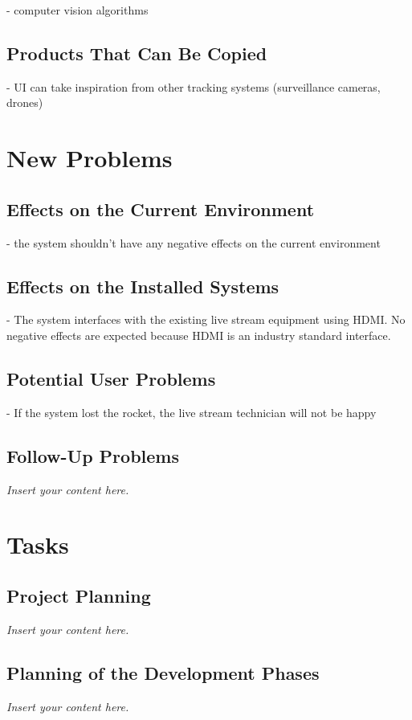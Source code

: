 \documentclass[12pt]{article}
\newcommand{\lips}{\textit{Insert your content here.}}
\begin{document}
- computer vision algorithms

\subsection{Products That Can Be Copied}

- UI can take inspiration from other tracking systems (surveillance cameras, drones)

\section{New Problems}
\subsection{Effects on the Current Environment}

- the system shouldn't have any negative effects on the current environment

\subsection{Effects on the Installed Systems}

- The system interfaces with the existing live stream equipment using HDMI. No negative effects are expected because HDMI is an industry standard interface.

\subsection{Potential User Problems}

- If the system lost the rocket, the live stream technician will not be happy

\subsection{Follow-Up Problems}
\lips

\section{Tasks}
\subsection{Project Planning}
\lips

\subsection{Planning of the Development Phases}
\lips
\end{document}

